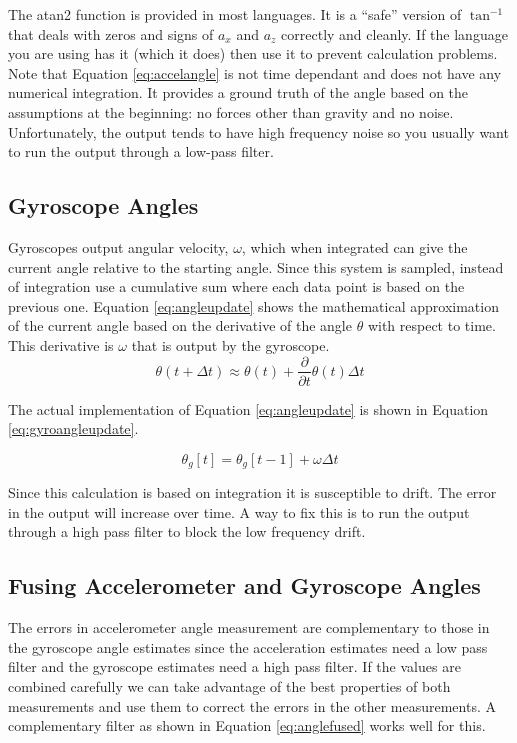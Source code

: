 The atan2 function is provided in most languages. It is a ``safe'' version of $\tan^{-1}$ that deals with 
zeros and signs of $a_x$ and $a_z$ correctly and cleanly. If the language you are using has it (which it does)
then use it to prevent calculation problems. Note that Equation \ref{eq:accelangle} is not time dependant
and does not have any numerical integration. It provides a ground truth of the angle based on the assumptions
at the beginning: no forces other than gravity and no noise. Unfortunately, the output tends to have high frequency
noise so you usually want to run the output through a low-pass filter.

\subsection{Gyroscope Angles}
Gyroscopes output angular velocity, $\omega$, which when integrated can give the current angle relative to the starting
angle. Since this system is sampled, instead of integration use a cumulative sum where each data point is based on the 
previous one. Equation \ref{eq:angleupdate} shows the mathematical approximation of the current angle based on the 
derivative of the angle $\theta$ with respect to time. This derivative is $\omega$ that is output by the gyroscope.
\begin{equation}
	\label{eq:angleupdate}
	\theta(t + \Delta t) \approx \theta(t) + \frac{\partial}{\partial t}\theta(t)\Delta t
\end{equation}

The actual implementation of Equation \ref{eq:angleupdate} is shown in Equation \ref{eq:gyroangleupdate}.

\begin{equation}
	\label{eq:gyroangleupdate}
	\theta_g[t] = \theta_g[t-1] + \omega\Delta t
\end{equation}

Since this calculation is based on integration it is susceptible to drift. The error in the output will 
increase over time. A way to fix this is to run the output through a high pass filter to block the 
low frequency drift.

\subsection{Fusing Accelerometer and Gyroscope Angles}
The errors in accelerometer angle measurement are complementary to those in the gyroscope angle estimates 
since the acceleration estimates need a low pass filter and the gyroscope estimates need a high pass filter.
If the values are combined carefully we can take advantage of the best properties of both measurements and 
use them to correct the errors in the other measurements. A complementary filter as shown in Equation 
\ref{eq:anglefused} works well for this.

